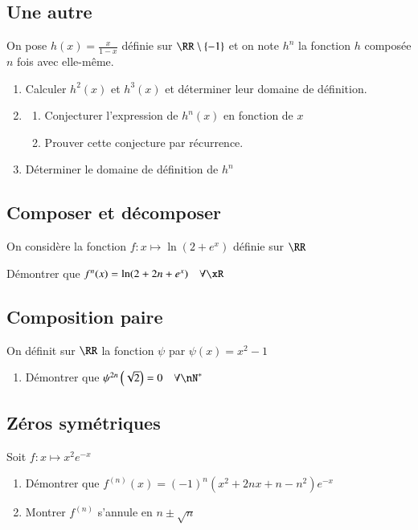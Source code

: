 \documentclass[oneside,12pt]{article}          %
\begin{document}
\subsection{Une autre}
On pose $h(x)=\frac{x}{1-x}$ définie sur $\RR\setminus\{-1\}$ et on note $h^n$ la fonction $h$ composée $n$ fois avec elle-même.
\begin{enumerate}
	\item Calculer $h^2(x)$ et $h^3(x)$ et déterminer leur domaine de définition.
	\item \begin{enumerate}
		\item Conjecturer l'expression de $h^n(x)$ en fonction de $x$
		\item Prouver cette conjecture par récurrence.
	\end{enumerate}	 
	\item Déterminer le domaine de définition de $h^n$
\end{enumerate}



\subsection{Composer et décomposer}
On considère la fonction $f:x\mapsto \ln(2+e^x)$ définie sur $\RR$

Démontrer que $f^n(x)=\ln(2+2n+e^x) \quad \forall\xR$



\subsection{Composition paire}
On définit sur $\RR$ la fonction $\psi$ par $\psi(x)=x^2-1$
\begin{enumerate}
	\item Démontrer que $\psi^{2n}\left(\sqrt{2}\right)=0 \quad \forall\nN^*$
\end{enumerate}


\subsection{Zéros symétriques}
Soit $f:x\mapsto x^2e^{-x}$
\begin{enumerate}
	\item Démontrer que $f^{(n)}(x)=(-1)^n(x^2+2nx+n-n^2)e^{-x}$
	\item Montrer $f^{(n)}$ s'annule en $n\pm\sqrt{n}$
\end{enumerate}
\end{document}

